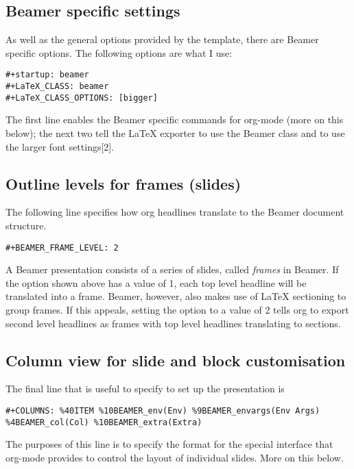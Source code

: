 \documentclass[presentation]{beamer}
\begin{document}
\subsection{Beamer specific settings}
\label{sec:org279ab00}
As well as the general options provided by the template, there are
Beamer specific options.  The following options are what I use:

\begin{verbatim}
#+startup: beamer
#+LaTeX_CLASS: beamer
#+LaTeX_CLASS_OPTIONS: [bigger]
\end{verbatim}

The first line enables the Beamer specific commands for org-mode (more
on this below); the next two tell the \LaTeX{} exporter to use the
Beamer class and to use the larger font settings[2].

\subsection{Outline levels for frames (slides)}
\label{sec:orga956ce6}

The following line specifies how org headlines translate to the Beamer
document structure.

\begin{verbatim}
#+BEAMER_FRAME_LEVEL: 2
\end{verbatim}

A Beamer presentation consists of a series of slides, called \emph{frames}
in Beamer.  If the option shown above has a value of 1, each top level
headline will be translated into a frame.  Beamer, however, also makes
use of \LaTeX{} sectioning to group frames.  If this appeals, setting
the option to a value of 2 tells org to export second level headlines
as frames with top level headlines translating to sections.
\subsection{Column view for slide and block customisation}
\label{sec:org254f471}
The final line that is useful to specify to set up the presentation is

\begin{verbatim}
#+COLUMNS: %40ITEM %10BEAMER_env(Env) %9BEAMER_envargs(Env Args) %4BEAMER_col(Col) %10BEAMER_extra(Extra)
\end{verbatim}

The purposes of this line is to specify the format for the special
interface that org-mode provides to control the layout of individual
slides.  More on this below.
\end{document}
